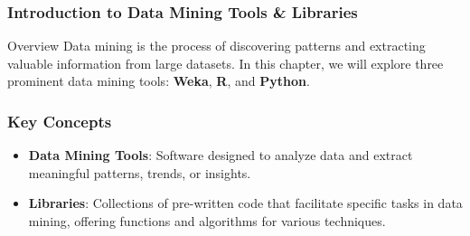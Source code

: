 \documentclass[aspectratio=169]{beamer}
\begin{document}
\frame{\titlepage}

\begin{frame}[fragile]
    \frametitle{Introduction to Data Mining Tools \& Libraries}
    \begin{block}{Overview}
        Data mining is the process of discovering patterns and extracting valuable information from large datasets. 
        In this chapter, we will explore three prominent data mining tools: 
        \textbf{Weka}, \textbf{R}, and \textbf{Python}.
    \end{block}
\end{frame}

\begin{frame}[fragile]
    \frametitle{Key Concepts}
    \begin{itemize}
        \item \textbf{Data Mining Tools}: Software designed to analyze data and extract meaningful patterns, trends, or insights.
        \item \textbf{Libraries}: Collections of pre-written code that facilitate specific tasks in data mining, offering functions and algorithms for various techniques.
    \end{itemize}
\end{frame}
\end{document}
